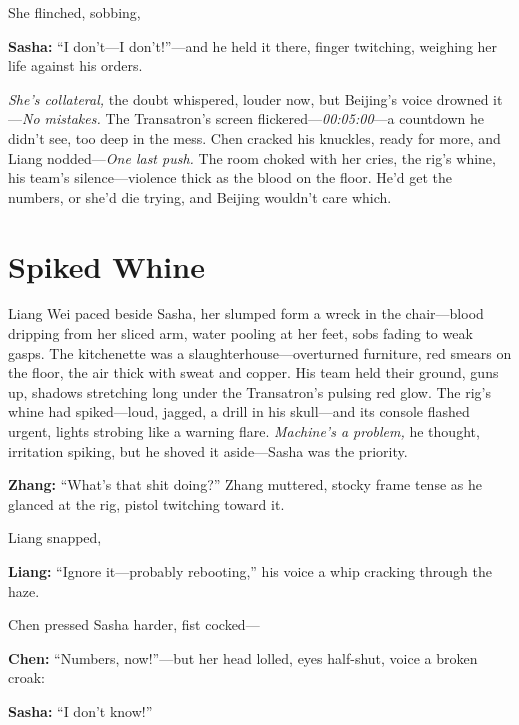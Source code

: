 \documentclass[12pt]{book}
\begin{document}
She flinched, sobbing, 

\vspace{0.5em}
\textbf{Sasha:} “I don’t—I don’t!”—and he held it there, finger twitching, weighing her life against his orders.

\emph{She’s collateral,} the doubt whispered, louder now, but Beijing’s voice drowned it—\emph{No mistakes.} The Transatron’s screen flickered—\emph{00:05:00}—a countdown he didn’t see, too deep in the mess. Chen cracked his knuckles, ready for more, and Liang nodded—\emph{One last push.} The room choked with her cries, the rig’s whine, his team’s silence—violence thick as the blood on the floor. He’d get the numbers, or she’d die trying, and Beijing wouldn’t care which.

\vspace{1em}

\section{Spiked Whine}

Liang Wei paced beside Sasha, her slumped form a wreck in the chair—blood dripping from her sliced arm, water pooling at her feet, sobs fading to weak gasps. The kitchenette was a slaughterhouse—overturned furniture, red smears on the floor, the air thick with sweat and copper. His team held their ground, guns up, shadows stretching long under the Transatron’s pulsing red glow. The rig’s whine had spiked—loud, jagged, a drill in his skull—and its console flashed urgent, lights strobing like a warning flare. \emph{Machine’s a problem,} he thought, irritation spiking, but he shoved it aside—Sasha was the priority.

\vspace{0.5em}
\textbf{Zhang:} “What’s that shit doing?” Zhang muttered, stocky frame tense as he glanced at the rig, pistol twitching toward it.

Liang snapped, 

\vspace{0.5em}
\textbf{Liang:} “Ignore it—probably rebooting,” his voice a whip cracking through the haze.

Chen pressed Sasha harder, fist cocked— 

\vspace{0.5em}
\textbf{Chen:} “Numbers, now!”—but her head lolled, eyes half-shut, voice a broken croak: 

\vspace{0.5em}
\textbf{Sasha:} “I don’t know!”
\end{document}

